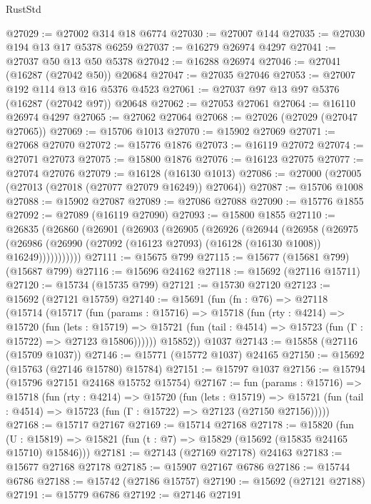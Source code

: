 \begin{lexlean}{RustStd}
\begin{coremodule}
@27029 := @27002 @314 @18 @6774
@27030 := @27007 @144
@27035 := @27030 @194 @13 @17 @5378 @6259
@27037 := @16279 @26974 @4297
@27041 := @27037 @50 @13 @50 @5378
@27042 := @16288 @26974
@27046 := @27041 (@16287 (@27042 @50)) @20684
@27047 := @27035 @27046
@27053 := @27007 @192 @114 @13 @16 @5376 @4523
@27061 := @27037 @97 @13 @97 @5376 (@16287 (@27042 @97)) @20648
@27062 := @27053 @27061
@27064 := @16110 @26974 @4297
@27065 := @27062 @27064
@27068 := @27026 (@27029 (@27047 @27065))
@27069 := @15706 @1013
@27070 := @15902 @27069
@27071 := @27068 @27070
@27072 := @15776 @1876
@27073 := @16119 @27072
@27074 := @27071 @27073
@27075 := @15800 @1876
@27076 := @16123 @27075
@27077 := @27074 @27076
@27079 := @16128 (@16130 @1013)
@27086 := @27000 (@27005 (@27013 (@27018 (@27077 @27079 @16249)) @27064))
@27087 := @15706 @1008
@27088 := @15902 @27087
@27089 := @27086 @27088
@27090 := @15776 @1855
@27092 := @27089 (@16119 @27090)
@27093 := @15800 @1855
@27110 := @26835
    (@26860
      (@26901
        (@26903
          (@26905
            (@26926
              (@26944
                (@26958
                  (@26975
                    (@26986
                      (@26990 (@27092 (@16123 @27093) (@16128 (@16130 @1008)) @16249)))))))))))
@27111 := @15675 @799
@27115 := @15677 (@15681 @799) (@15687 @799)
@27116 := @15696 @24162
@27118 := @15692 (@27116 @15711)
@27120 := @15734 (@15735 @799)
@27121 := @15730 @27120
@27123 := @15692 (@27121 @15759)
@27140 := @15691
    (fun (fn : @76) =>
    @27118
      (@15714
        (@15717
          (fun (params : @15716) =>
          @15718
            (fun (rty : @4214) =>
            @15720
              (fun (lets : @15719) =>
              @15721 (fun (tail : @4514) => @15723 (fun (Γ : @15722) => @27123 @15806))))))
        @15852))
    @1037
@27143 := @15858 (@27116 (@15709 @1037))
@27146 := @15771 (@15772 @1037) @24165
@27150 := @15692 (@15763 (@27146 @15780) @15784)
@27151 := @15797 @1037
@27156 := @15794 (@15796 @27151 @24168 @15752 @15754)
@27167 := fun (params : @15716) =>
  @15718
    (fun (rty : @4214) =>
    @15720
      (fun (lets : @15719) =>
      @15721 (fun (tail : @4514) => @15723 (fun (Γ : @15722) => @27123 (@27150 @27156)))))
@27168 := @15717 @27167
@27169 := @15714 @27168
@27178 := @15820
    (fun (U : @15819) => @15821 (fun (t : @7) => @15829 (@15692 (@15835 @24165 @15710) @15846)))
@27181 := @27143 (@27169 @27178) @24163
@27183 := @15677 @27168 @27178
@27185 := @15907 @27167 @6786
@27186 := @15744 @6786
@27188 := @15742 (@27186 @15757)
@27190 := @15692 (@27121 @27188)
@27191 := @15779 @6786
@27192 := @27146 @27191

\end{coremodule}
\end{lexlean}
